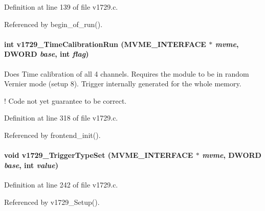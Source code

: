 Definition at line 139 of file v1729.c.

Referenced by begin\_\-of\_\-run().
\paragraph[{v1729\_\-TimeCalibrationRun}]{\setlength{\rightskip}{0pt plus 5cm}int v1729\_\-TimeCalibrationRun ({\bf MVME\_\-INTERFACE} $\ast$ {\em mvme}, \/  {\bf DWORD} {\em base}, \/  int {\em flag})}\hfill\label{v1729_8h_a6a5b223f30c983b7f4dcac408d3f8b9f}
Does Time calibration of all 4 channels. Requires the module to be in random Vernier mode (setup 8). Trigger internally generated for the whole memory.

! Code not yet guarantee to be correct. 

Definition at line 318 of file v1729.c.

Referenced by frontend\_\-init().
\paragraph[{v1729\_\-TriggerTypeSet}]{\setlength{\rightskip}{0pt plus 5cm}void v1729\_\-TriggerTypeSet ({\bf MVME\_\-INTERFACE} $\ast$ {\em mvme}, \/  {\bf DWORD} {\em base}, \/  int {\em value})}\hfill\label{v1729_8h_a12b51ae0d0a7824c97d04269629cdf5c}


Definition at line 242 of file v1729.c.

Referenced by v1729\_\-Setup().